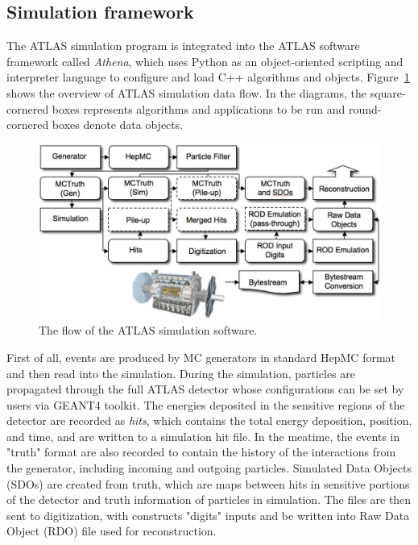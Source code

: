 \subsection{Simulation framework}

The ATLAS simulation program is integrated into the ATLAS software framework called \textit{Athena}\cite{atlas:athena},
which uses Python as an object-oriented scripting and interpreter language to configure and load C++ algorithms and objects.
Figure~\ref{fig:frame_overview} shows the overview of ATLAS simulation data flow\cite{Aad:2010ah}.
In the diagrams, the square-cornered boxes represents algorithms and applications to be run and round-cornered boxes denote data objects.
\begin{figure}[!htb]
  \centering
  \includegraphics[width=1.0\textwidth]{figures/Simulation/outline_atalsSimulation_v2.png}
  \caption{The flow of the ATLAS simulation software.}
  \label{fig:frame_overview}
\end{figure}

First of all, events are produced by MC generators in standard HepMC format and then read into the simulation.
During the simulation, particles are propagated through the full ATLAS detector whose configurations can be set by users via GEANT4 toolkit.
The energies deposited in the sensitive regions of the detector are recorded as \textit{hits}, which contains the total energy deposition,
position, and time, and are written to a simulation hit file.
In the meatime, the events in "truth" format are also recorded to contain the history of the interactions from the generator, including incoming and outgoing particles.
Simulated Data Objects (SDOs) are created from truth, which are maps between hits in sensitive portions of the detector and truth information of particles in simulation.
The files are then sent to digitization, with constructs "digits" inputs and be written into Raw Data Object (RDO) file used for reconstruction.

